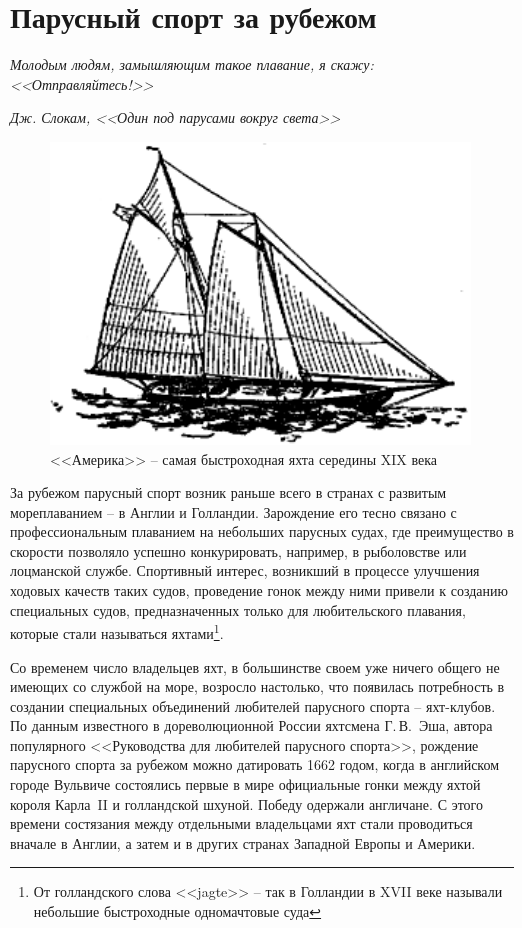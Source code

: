 \documentclass[a4paper, 12pt, twoside, final]{scrbook}
\begin{document}
\section{Парусный спорт за рубежом}
\epigraph{\emph{Молодым людям, замышляющим такое плавание, я скажу: <<Отправляйтесь!>>}}{\emph{Дж. Слокам, <<Один под парусами вокруг света>>}}

\begin{figure}
\centering\includegraphics{pics/Amerika}
\protect\caption{<<Америка>> \--- самая быстроходная яхта середины XIX века}
\end{figure}

За рубежом парусный спорт возник раньше всего в странах с развитым
мореплаванием \--- в Англии и Голландии. Зарождение его тесно связано
с профессиональным плаванием на небольших парусных судах, где преимущество
в скорости позволяло успешно конкурировать, например, в рыболовстве
или лоцманской службе. Спортивный интерес, возникший в процессе улучшения
ходовых качеств таких судов, проведение гонок между ними привели к
созданию специальных судов, предназначенных только для любительского
плавания, которые стали называться яхтами\footnote{От голландского слова <<jagte>> \--- так в Голландии в XVII веке называли
небольшие быстроходные одномачтовые суда}.

Со временем число владельцев яхт, в большинстве своем уже ничего общего
не имеющих со службой на море, возросло настолько, что появилась потребность
в создании специальных объединений любителей парусного спорта \--- яхт-клубов.
По данным известного в дореволюционной России яхтсмена Г.\,В.~Эша,
автора популярного <<Руководства для любителей парусного спорта>>, рождение
парусного спорта за рубежом можно датировать 1662 годом, когда в английском
городе Вульвиче состоялись первые в мире официальные гонки между яхтой
короля Карла~II и голландской шхуной. Победу одержали англичане. С
этого времени состязания между отдельными владельцами яхт стали проводиться
вначале в Англии, а затем и в других странах Западной Европы и Америки.
\end{document}
